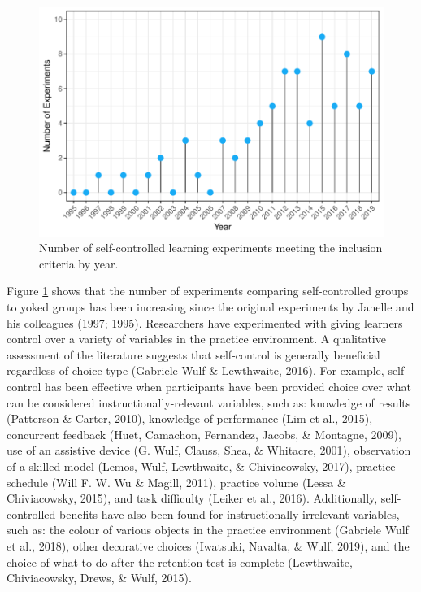 \documentclass[
  english,
  man,floatsintext]{apa7}
\begin{document}
\begin{figure}

{\centering \includegraphics[height=0.51\textheight]{../../figs/fig1} 

}

\caption{Number of self-controlled learning experiments meeting the inclusion criteria by year.}\label{fig:fig1}
\end{figure}

Figure \ref{fig:fig1} shows that the number of experiments comparing self-controlled groups to yoked groups has been increasing since the original experiments by Janelle and his colleagues (1997; 1995). Researchers have experimented with giving learners control over a variety of variables in the practice environment. A qualitative assessment of the literature suggests that self-control is generally beneficial regardless of choice-type (Gabriele Wulf \& Lewthwaite, 2016). For example, self-control has been effective when participants have been provided choice over what can be considered instructionally-relevant variables, such as: knowledge of results (Patterson \& Carter, 2010), knowledge of performance (Lim et al., 2015), concurrent feedback (Huet, Camachon, Fernandez, Jacobs, \& Montagne, 2009), use of an assistive device (G. Wulf, Clauss, Shea, \& Whitacre, 2001), observation of a skilled model (Lemos, Wulf, Lewthwaite, \& Chiviacowsky, 2017), practice schedule (Will F. W. Wu \& Magill, 2011), practice volume (Lessa \& Chiviacowsky, 2015), and task difficulty (Leiker et al., 2016). Additionally, self-controlled benefits have also been found for instructionally-irrelevant variables, such as: the colour of various objects in the practice environment (Gabriele Wulf et al., 2018), other decorative choices (Iwatsuki, Navalta, \& Wulf, 2019), and the choice of what to do after the retention test is complete (Lewthwaite, Chiviacowsky, Drews, \& Wulf, 2015).
\end{document}

